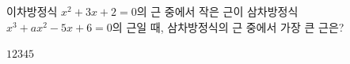 이차방정식 $x^2+3x+2=0$의 근 중에서 작은 근이 삼차방정식 $x^3+ax^2-5x+6=0$의 근일 때, 삼차방정식의 근 중에서 가장 큰 근은? 
\begin{choices32}{$1$}{$2$}{$3$}{$4$}{$5$}\end{choices32}
